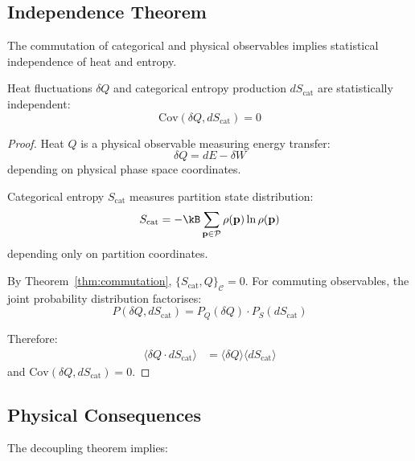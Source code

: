 \subsection{Independence Theorem}

The commutation of categorical and physical observables implies statistical independence of heat and entropy.

\begin{theorem}
\label{thm:decoupling}
Heat fluctuations $\delta Q$ and categorical entropy production $dS_{\mathrm{cat}}$ are statistically independent:
\begin{equation}
    \mathrm{Cov}(\delta Q, dS_{\mathrm{cat}}) = 0
\end{equation}
\end{theorem}

\begin{proof}
Heat $Q$ is a physical observable measuring energy transfer:
\begin{equation}
    \delta Q = dE - \delta W
\end{equation}
depending on physical phase space coordinates.

Categorical entropy $S_{\mathrm{cat}}$ measures partition state distribution:
\begin{equation}
    S_{\mathrm{cat}} = -\kB \sum_{\mathbf{p} \in \mathcal{P}} \rho(\mathbf{p}) \ln \rho(\mathbf{p})
\end{equation}
depending only on partition coordinates.

By Theorem~\ref{thm:commutation}, $\{S_{\mathrm{cat}}, Q\}_{\mathcal{C}} = 0$. For commuting observables, the joint probability distribution factorises:
\begin{equation}
    P(\delta Q, dS_{\mathrm{cat}}) = P_Q(\delta Q) \cdot P_S(dS_{\mathrm{cat}})
\end{equation}

Therefore:
\begin{align}
    \langle \delta Q \cdot dS_{\mathrm{cat}} \rangle &= \langle \delta Q \rangle \langle dS_{\mathrm{cat}} \rangle
\end{align}
and $\mathrm{Cov}(\delta Q, dS_{\mathrm{cat}}) = 0$.
\end{proof}

\subsection{Physical Consequences}

The decoupling theorem implies:

